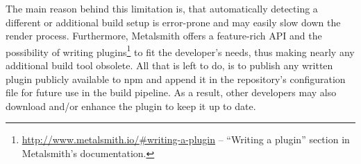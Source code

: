 The main reason behind this limitation is, that automatically detecting a different or additional build setup is error-prone and may easily slow down the render process. Furthermore, Metalsmith offers a feature-rich API and the possibility of writing plugins\footnote{\url{http://www.metalsmith.io/\#writing-a-plugin} -- ``Writing a plugin'' section in Metalsmith's documentation.} to fit the developer's needs, thus making nearly any additional build tool obsolete. All that is left to do, is to publish any written plugin publicly available to npm and append it in the repository's configuration file for future use in the build pipeline. As a result, other developers may also download and/or enhance the plugin to keep it up to date.
